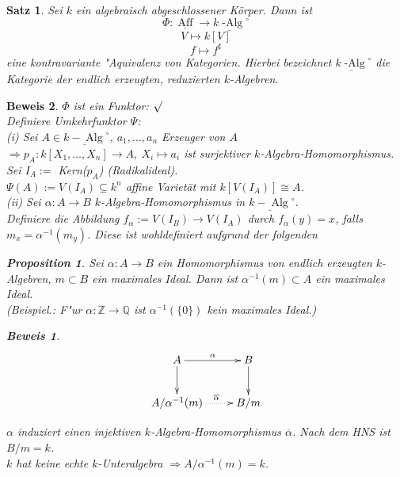 \documentclass[a4paper,12pt]{report}
\theoremstyle{break}
\newtheorem{Satz}{Satz}
\newtheorem{Prop}[Def]{Proposition}
\theoremstyle{nonumberbreak}
\theoremstyle{nonumberplain}
\newtheorem{Bew}{Beweis}
\begin{document}
\begin{Satz}
\label{satz:4}
Sei $k$ ein algebraisch abgeschlossener Körper. Dann ist 
$$\Phi:\underline{\operatorname{Aff}} \longrightarrow \underline{k\operatorname{-Alg}}^{\circ}$$
$$V \longmapsto k[V]$$
$$f\longmapsto f^{\sharp}$$
eine kontravariante "Aquivalenz von Kategorien.
Hierbei bezeichnet $\underline{k\operatorname{-Alg}}^{\circ}$ die Kategorie der endlich erzeugten, reduzierten $k$-Algebren.
\end{Satz}
\begin{Bew}
$\Phi$ ist ein Funktor: $\surd$\\
Definiere Umkehrfunktor $\Psi$:~\\
(i) Sei $A\in \underline{k-\operatorname{Alg}}^{\circ}$, $a_1,\dots,a_n$ Erzeuger von $A$\\
$\Rightarrow p_A: k[X_1,\dots,X_n] \rightarrow A, \ X_i \mapsto a_i$ ist surjektiver $k$-Algebra-Homomorphismus.\\
Sei $I_A:=$ Kern($p_A$) (Radikalideal).\\
$\Psi(A):= V(I_A)\subseteq k^n$ affine Varietät mit $k[V(I_A)]\cong A$.\\
(ii) Sei $\alpha: A\rightarrow B$ $k$-Algebra-Homomorphismus in $\underline{k-\operatorname{Alg}}^{\circ}$.\\
Definiere die Abbildung $f_{\alpha} := V(I_B) \rightarrow V(I_A)$ durch $f_{\alpha}(y)=x$, falls $m_x=\alpha^{-1}(m_y)$. Diese ist wohldefiniert aufgrund der folgenden 
\begin{Prop}
Sei $\alpha : A\rightarrow B$ ein Homomorphismus von endlich erzeugten $k$-Algebren, $m\subset B$ ein maximales Ideal. Dann ist $\alpha^{-1}(m)\subset A$ ein maximales Ideal.\\
(Beispiel.: F"ur $\alpha:\mathbb{Z}\rightarrow \mathbb{Q}$ ist $\alpha^{-1}(\{0\})$ kein maximales Ideal.) 
\end{Prop}
\begin{Bew}

\[
\begin{xy}
\xymatrix{
A\ar[r]^{\alpha}\ar[d]&B\ar[d] \\
A/\alpha^{-1}(m)\ar@{.>}[r]^{\ \ \overline{\alpha}}&B/m
}
\end{xy}
\]

$\alpha$ induziert einen injektiven $k$-Algebra-Homomorphismus $\overline{\alpha}$. Nach dem HNS ist $B/m=k$.\\
$k$ hat keine echte $k$-Unteralgebra $\Rightarrow A/\alpha^{-1}(m)=k$.
\end{Bew}


\end{Bew}
\end{document}
